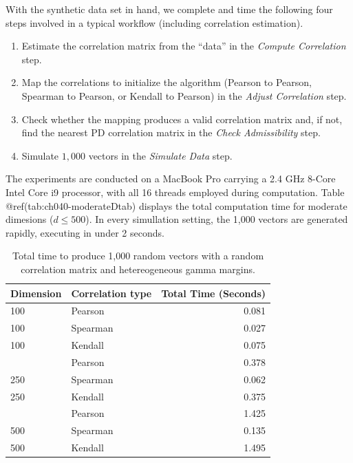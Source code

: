 \documentclass[
]{jss}
\providecommand{\tightlist}{%
  \setlength{\itemsep}{0pt}\setlength{\parskip}{0pt}}
\begin{document}
With the synthetic data set in hand, we complete and time the following
four steps involved in a typical workflow (including correlation
estimation).


\begin{enumerate}
\def\labelenumi{\arabic{enumi}.}
\tightlist
\item
  Estimate the correlation matrix from the ``data'' in the \emph{Compute
  Correlation} step.
\item
  Map the correlations to initialize the algorithm (Pearson to Pearson,
  Spearman to Pearson, or Kendall to Pearson) in the \emph{Adjust
  Correlation} step.
\item
  Check whether the mapping produces a valid correlation matrix and, if
  not, find the nearest PD correlation matrix in the \emph{Check
  Admissibility} step.
\item
  Simulate \(1,000\) vectors in the \emph{Simulate Data} step.
\end{enumerate}

The experiments are conducted on a MacBook Pro carrying a 2.4 GHz 8-Core
Intel Core i9 processor, with all 16 threads employed during
computation. Table @ref(tab:ch040-moderateDtab) displays the total
computation time for moderate dimesions (\(d \leq 500\)). In every
simullation setting, the 1,000 vectors are generated rapidly, executing
in under 2 seconds.

\begin{CodeChunk}
\begin{table}

\caption{\label{tab:tab:ch040-moderateDtab}Total time to produce 1,000 random vectors with a random correlation matrix and hetereogeneous gamma margins.}
\centering
\begin{tabular}[t]{llr}
\toprule
Dimension & Correlation type & Total Time (Seconds)\\
\midrule
100 & Pearson & 0.081\\
100 & Spearman & 0.027\\
100 & Kendall & 0.075\\
\addlinespace
250 & Pearson & 0.378\\
250 & Spearman & 0.062\\
250 & Kendall & 0.375\\
\addlinespace
500 & Pearson & 1.425\\
500 & Spearman & 0.135\\
500 & Kendall & 1.495\\
\bottomrule
\end{tabular}
\end{table}

\end{CodeChunk}
\end{document}
